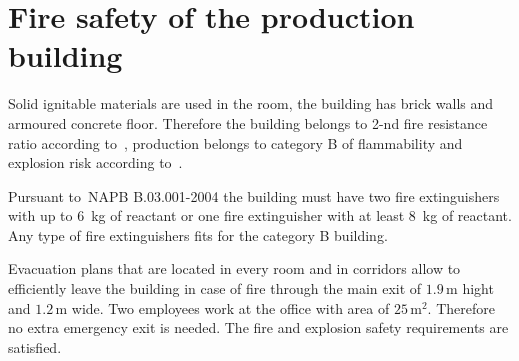 \section{Fire safety of the production building}
Solid ignitable materials are used in the room, the building has brick walls
and armoured concrete floor. Therefore the building belongs to 2-nd fire
resistance ratio according to~\cite{dbn_b11}, production belongs to category B
of flammability and explosion risk according to~\cite{napb002}.

Pursuant to~NAPB B.03.001-2004 the building must have two fire extinguishers with
up to 6~kg of reactant or one fire extinguisher with at least 8~kg of reactant.
Any type of fire extinguishers fits for the category B building.

Evacuation plans that are located in every room and in corridors allow to
efficiently leave the building in case of fire through the main exit of
 $1.9 \, \text{m}$ hight and $1.2 \, \text{m}$ wide. Two employees work at the
 office with area of $25 \, \text{m}^2$. Therefore no extra emergency exit is
 needed. The fire and explosion safety requirements are satisfied.


